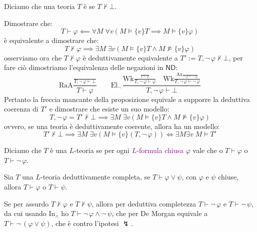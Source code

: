 \begin{definition}
    Diciamo che una teoria $T$ è  se $T \nvdash \bot$.
\end{definition}

\begin{remark}
    Dimostrare che:
    \[ T \vdash \varphi \impliedby \forall M \; \forall v (M \models \{v\}T \implies M \models \{v\}\varphi) \]
    è equivalente a dimostrare che:
    \[ T \nvdash \varphi \implies \exists M \; \exists v (M \models \{v\}T \land M \not\models \{v\}\varphi) \]
    osserviamo ora che $T \nvdash \varphi$ è deduttivamente equivalente a $T':= T,\neg \, \varphi \nvdash \bot$, per fare ciò dimostriamo l'equivalenza delle negazioni in $\mathsf{ND}$:
    \[ \text{RaA}\frac{\displaystyle\frac{}{T,\neg \,\varphi \vdash \bot}}{T \vdash \varphi} \qquad \text{El}_\neg \,\frac{\displaystyle\text{Wk}\frac{\displaystyle\frac{}{T \vdash \varphi}}{T,\neg \,\varphi \vdash \varphi} \quad \text{Wk}\frac{\displaystyle\text{Ax}\frac{}{\neg \, \varphi \vdash \neg \, \varphi}}{T,\neg \,\varphi \vdash \neg \, \varphi}}{T,\neg \,\varphi \vdash \bot}
    \]
    Pertanto la freccia mancante della proposizione equivale a supporre la deduttiva coerenza di $T'$ e dimostrare che esiste un suo modello:
    \[ T,\neg \, \varphi = T' \nvdash \bot \implies \exists M \; \exists v (M \models \{v\}T \land M \not\models \{v\}\varphi) \]
    ovvero, se una teoria è deduttivamente coerente, allora ha un modello:
    \[ T' \nvdash \bot \implies \exists M \; \exists v (M \models \{v\}(T, \neg \, \varphi)) \iff \exists M \exists v \; M \models T' \]
\end{remark}

\begin{definition}
    Diciamo che $T$ è una $L$-teoria  se per ogni \textcolor{purple}{$L$-formula chiusa} $\varphi$ vale che o $T \vdash \varphi$ o $T \vdash \neg \,\varphi$.
\end{definition}

\begin{exercise}
    Sia $T$ una $L$-teoria deduttivamente completa, se $T \vdash \varphi \lor \psi$, con $\varphi$ e $\psi$ chiuse, allora $T \vdash \varphi$ o $T \vdash \psi$.
\end{exercise}

\begin{soln}
    Se per assurdo $T \nvdash \varphi$ e $T \nvdash \psi$, allora per deduttiva completezza $T \vdash \neg \,\varphi$ e $T \vdash \neg \,\psi$, da cui usando In$_\land$ ho $T \vdash \neg \,\varphi \land \neg \,\psi$, che per De Morgan equivale a $T \vdash \neg \,(\varphi \lor \psi)$, che è contro l'ipotesi $\lightning$.
\end{soln}

